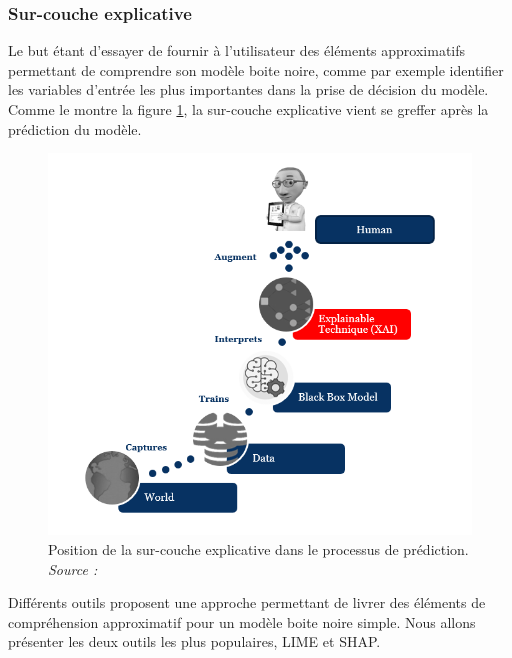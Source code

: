 \subsubsection{Sur-couche explicative}
Le but étant d'essayer de fournir à l'utilisateur des éléments approximatifs permettant de comprendre son modèle boite noire, comme par exemple identifier les variables d'entrée les plus importantes dans la prise de décision du modèle. Comme le montre la figure \ref{explainCouche}, la sur-couche explicative vient se greffer après la prédiction du modèle.
\begin{figure}[h]
\centering
\includegraphics[scale=0.35]{src_img/explainCouche.png}
\caption{Position de la sur-couche explicative dans le processus de prédiction. \textit{Source : \cite{kdCouche}}}
\label{explainCouche}
\end{figure}
Différents outils proposent une approche permettant de livrer des éléments de compréhension approximatif pour un modèle boite noire simple. Nous allons présenter les deux outils les plus populaires, LIME et SHAP.
